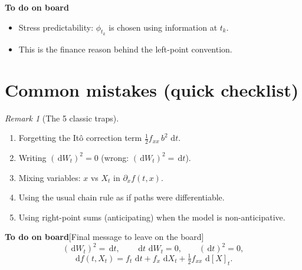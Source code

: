 \documentclass[11pt]{article}
\newcommand{\1}{\mathbf{1}}
\newcommand{\dd}{\,\mathrm{d}}
\numberwithin{equation}{section}
\theoremstyle{plain}
\theoremstyle{definition}
\theoremstyle{remark}
\newtheorem{remark}[theorem]{Remark}
\begin{document}
\textbf{To do on board}
\begin{itemize}[leftmargin=2em]
  \item Stress predictability: $\phi_{t_k}$ is chosen using information at $t_k$.
  \item This is the finance reason behind the left-point convention.
\end{itemize}


\section{Common mistakes (quick checklist)}

\begin{remark}[The 5 classic traps]
\begin{enumerate}[leftmargin=2em]
  \item Forgetting the It\^o correction term $\tfrac12 f_{xx}\,b^2\,\dd t$.
  \item Writing $(\dd W_t)^2=0$ (wrong: $(\dd W_t)^2=\dd t$).
  \item Mixing variables: $x$ vs $X_t$ in $\partial_x f(t,x)$.
  \item Using the usual chain rule as if paths were differentiable.
  \item Using right-point sums (anticipating) when the model is non-anticipative.
\end{enumerate}
\end{remark}

\textbf{To do on board}[Final message to leave on the board]
\[
(\dd W_t)^2=\dd t,\qquad \dd t\,\dd W_t=0,\qquad (\dd t)^2=0,
\]
\[
\dd f(t,X_t)=f_t\,\dd t+f_x\,\dd X_t+\tfrac12 f_{xx}\,\dd[X]_t.
\]
\end{document}
